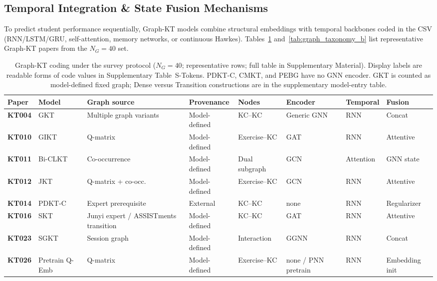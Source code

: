 \documentclass[lettersize,journal]{IEEEtran}
\begin{document}
\subsection{Temporal Integration \& State Fusion Mechanisms}
To predict student performance sequentially, Graph-KT models combine structural embeddings with temporal backbones coded in the CSV (RNN/LSTM/GRU, self-attention, memory networks, or continuous Hawkes). Tables~\ref{tab:graph_taxonomy} and~\ref{tab:graph_taxonomy_b} list representative Graph-KT papers from the $N_G=40$ set.
\begin{table}[t]
\caption{Graph-KT coding under the survey protocol ($N_G=40$; representative rows; full table in Supplementary Material). Display labels are readable forms of code values in Supplementary Table~S-Tokens. PDKT-C, CMKT, and PEBG have no GNN encoder. GKT is counted as model-defined fixed graph; Dense versus Transition constructions are in the supplementary model-entry table.}
\label{tab:graph_taxonomy}
\centering
\footnotesize
\setlength{\tabcolsep}{3.5pt}
\begin{tabular}{@{}ll>{\raggedright\arraybackslash}p{2.15cm}l>{\raggedright\arraybackslash}p{1.55cm}lll@{}}
\toprule
\textbf{Paper} & \textbf{Model} & \textbf{Graph source} & \textbf{Provenance} & \textbf{Nodes} & \textbf{Encoder} & \textbf{Temporal} & \textbf{Fusion} \\
\midrule
\textbf{KT004} & GKT \cite{KT004_GKT_2019} & Multiple graph variants & Model-defined & KC--KC & Generic GNN & RNN & Concat \\
\textbf{KT010} & GIKT \cite{KT010_GIKT_2021} & Q-matrix & Model-defined & Exercise--KC & GAT & RNN & Attentive \\
\textbf{KT011} & Bi-CLKT \cite{KT011_BiCLKT_2022} & Co-occurrence & Model-defined & Dual subgraph & GCN & Attention & GNN state \\
\textbf{KT012} & JKT \cite{KT012_JKT_2021} & Q-matrix + co-occ. & Model-defined & Exercise--KC & GCN & RNN & Attentive \\
\textbf{KT014} & PDKT-C \cite{KT014_PDKTC_2018} & Expert prerequisite & External & KC--KC & none & RNN & Regularizer \\
\textbf{KT016} & SKT \cite{KT016_SKT_2020} & Junyi expert / ASSISTments transition & Model-defined & KC--KC & GAT & RNN & Attentive \\
\textbf{KT023} & SGKT \cite{KT023_SGKT_2022} & Session graph & Model-defined & Interaction & GGNN & RNN & Concat \\
\textbf{KT026} & Pretrain Q-Emb \cite{KT026_PretrainQ_2020} & Q-matrix & Model-defined & Exercise--KC & none / PNN pretrain & RNN & Embedding init \\

\end{tabular}
\end{table}
\end{document}
